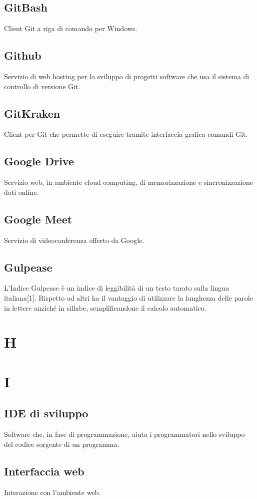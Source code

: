 \subsection*{GitBash} Client Git a riga di comando per Windows.
\subsection*{Github} Servizio di web hosting per lo sviluppo di progetti software che usa il sistema di controllo di versione Git.
\subsection*{GitKraken} Client per Git che permette di eseguire tramite interfaccia grafica comandi Git.
\subsection*{Google Drive} Servizio web, in ambiente cloud computing, di memorizzazione e sincronizzazione dati online.
\subsection*{Google Meet} Servizio di videoconferenza offerto da Google.
\subsection*{Gulpease} L'Indice Gulpease è un indice di leggibilità di un testo tarato sulla lingua italiana[1]. Rispetto ad altri ha il vantaggio di utilizzare la lunghezza delle parole in lettere anziché in sillabe, semplificandone il calcolo automatico. 
\newpage
\section{H}
\newpage
\section{I}
\subsection*{IDE di sviluppo} Software che, in fase di programmazione, aiuta i programmatori nello sviluppo del codice sorgente di un programma.
\subsection*{Interfaccia web} Interazione con l'ambiente web.
